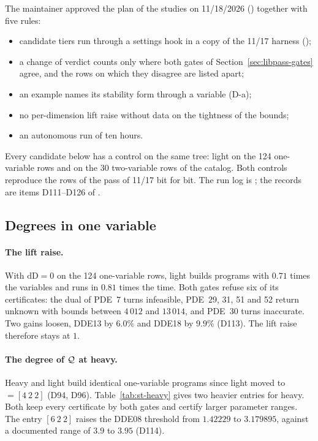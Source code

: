 The maintainer approved the plan of the studies on 11/18/2026 () together with five rules:
\begin{itemize}\setlength\itemsep{0pt}
\item candidate tiers run through a settings hook in a copy of the 11/17 harness ();
\item a change of verdict counts only where both gates of Section~\ref{sec:libpass-gates} agree, and the rows on which they disagree are listed apart;
\item an example names its stability form through a variable (D-a);
\item no per-dimension lift raise without data on the tightness of the bounds;
\item an autonomous run of ten hours.
\end{itemize}
Every candidate below has a control on the same tree: light on the 124 one-variable rows and on the 30 two-variable rows of the catalog. Both controls reproduce the rows of the pass of 11/17 bit for bit. The run log is ; the records are items D111--D126 of .

\subsection{Degrees in one variable}\label{sec:st-1d}

\paragraph{The lift raise.} With $\mathrm{dD}=0$ on the 124 one-variable rows, light builds programs with $0.71$ times the variables and runs in $0.81$ times the time. Both gates refuse six of its certificates: the dual of PDE~7 turns infeasible, PDE~29, 31, 51 and 52 return unknown with bounds between $4\,012$ and $13\,014$, and PDE~30 turns inaccurate. Two gains loosen, DDE13 by $6.0\%$ and DDE18 by $9.9\%$ (D113). The lift raise therefore stays at $1$.

\paragraph{The degree of $\mathcal{Q}$ at heavy.} Heavy and light build identical one-variable programs since light moved to  $=[4\ 2\ 2]$ (D94, D96). Table~\ref{tab:st-heavy} gives two heavier entries for heavy. Both keep every certificate by both gates and certify larger parameter ranges. The entry $[6\ 2\ 2]$ raises the DDE08 threshold from $1.42229$ to $3.179895$, against a documented range of $3.9$ to $3.95$ (D114).


